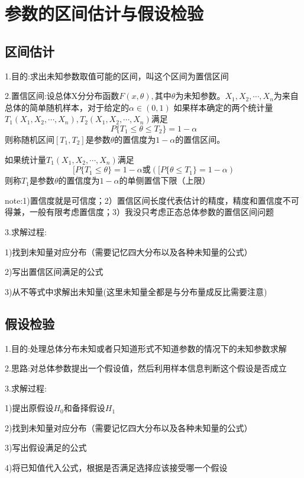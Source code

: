 \documentclass[11pt,twoside,a4paper]{ctexart}
\begin{document}
    
\section{参数的区间估计与假设检验}
\subsection{区间估计}

1.目的:求出未知参数取值可能的区间，叫这个区间为置信区间

2.置信区间:设总体X分分布函数$F(x,\theta ),$其中$\theta $为未知参数。$X_1,X_2,\cdots ,X_n$为来自总体的简单随机样本，对于给定的$\alpha \in (0,1)$
如果样本确定的两个统计量$T_1(X_1,X_2,\cdots ,X_n),T_2(X_1,X_2,\cdots ,X_n)$满足
\[P\{T_1 \leq \theta \leq T_2 \} = 1 - \alpha \]
则称随机区间$[T_1,T_2]$是参数$\theta $的置信度为$1 - \alpha$的置信区间。

如果统计量$T_1(X_1,X_2,\cdots ,X_n)$满足
\[[P\{T_1 \leq \theta \} = 1 - \alpha \text{或} ([P\{\theta \leq T_1 \} = 1 - \alpha)\]
则称$T_1$是参数$\theta $的置信度为$1 - \alpha $的单侧置信下限（上限）

note:1)置信度就是可信度；2）置信区间长度代表估计的精度，精度和置信度不可得兼，一般有限考虑置信度；3）我没只考虑正态总体参数的置信区间问题

3.求解过程:
\begin{minipage}[t]{0.9\linewidth}

    1)找到未知量对应分布（需要记忆四大分布以及各种未知量的公式）

    2)写出置信区间满足的公式

    3)从不等式中求解出未知量(这里未知量全都是与分布量成反比需要注意)

\end{minipage}

\subsection{假设检验}

1.目的:处理总体分布未知或者只知道形式不知道参数的情况下的未知参数求解

2.思路:对总体参数提出一个假设值，然后利用样本信息判断这个假设是否成立

3.求解过程:
\begin{minipage}[t]{0.9\linewidth}

    1)提出原假设$H_0$和备择假设$H_1$

    2)找到未知量对应分布（需要记忆四大分布以及各种未知量的公式）

    3)写出假设满足的公式

    4)将已知值代入公式，根据是否满足选择应该接受哪一个假设
    
\end{minipage}
\end{document}
